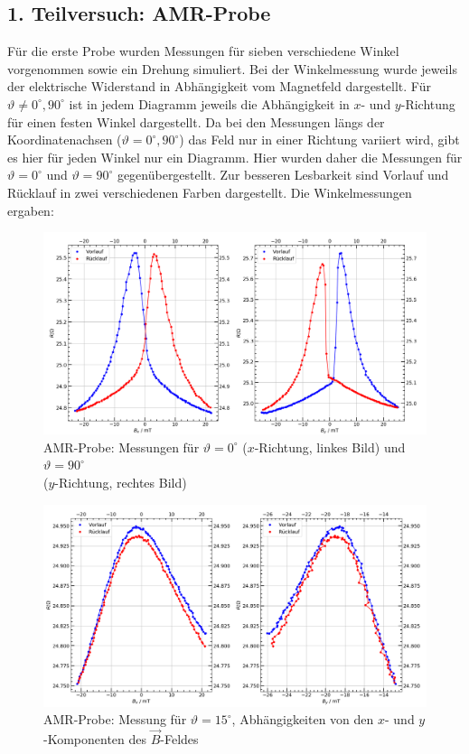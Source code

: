 \documentclass[german,  %
parskip=full,  %
]{scrartcl}
\begin{document}
\subsection{1. Teilversuch: AMR-Probe}
Für die erste Probe wurden Messungen für sieben verschiedene Winkel vorgenommen sowie ein Drehung simuliert. Bei der Winkelmessung wurde jeweils der elektrische Widerstand in Abhängigkeit vom Magnetfeld dargestellt. Für \(\vartheta\neq 0^{\circ},90^{\circ}\) ist in jedem Diagramm jeweils die Abhängigkeit in \(x\)- und \(y\)-Richtung für einen festen Winkel dargestellt. Da bei den Messungen längs der Koordinatenachsen (\(\vartheta = 0^{\circ},90^{\circ}\)) das Feld nur in einer Richtung variiert wird, gibt es hier für jeden Winkel nur ein Diagramm. Hier wurden daher die Messungen für  \(\vartheta = 0^{\circ}\) und \(\vartheta = 90^{\circ}\) gegenübergestellt. Zur besseren Lesbarkeit sind Vorlauf und Rücklauf in zwei verschiedenen Farben dargestellt. Die Winkelmessungen ergaben:
\newpage
\begin{figure}[h!]\centering
\includegraphics[width=\textwidth]{Probe1_0_und_90_Grad.png}
\caption{AMR-Probe: Messungen für \(\vartheta=0^{\circ}\) (\(x\)-Richtung, linkes Bild) und \(\vartheta=90^{\circ}\) \\ (\(y\)-Richtung, rechtes Bild)}
\end{figure} 
\begin{figure}[h!]\centering
\includegraphics[width=\textwidth]{Probe1_15_Grad.png}
\caption{AMR-Probe: Messung für \(\vartheta=15^{\circ}\), Abhängigkeiten von den \(x\)- und \(y\)-Komponenten des \(\vec{B}\)-Feldes}
\end{figure} 
\end{document}
